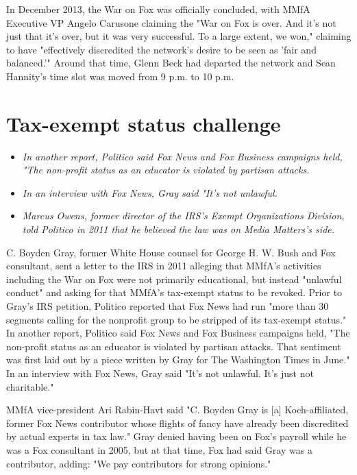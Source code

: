 In December 2013, the War on Fox was officially concluded, with MMfA
Executive VP Angelo Carusone claiming the "War on Fox is over. And it's
not just that it's over, but it was very successful. To a large extent,
we won," claiming to have "effectively discredited the network's desire
to be seen as 'fair and balanced.'" Around that time, Glenn Beck had
departed the network and Sean Hannity's time slot was moved from 9 p.m.
to 10 p.m.

\section{Tax-exempt status challenge}\label{tax-exempt-status-challenge}

\begin{itemize}
\item
  \emph{In another report, Politico said Fox News and Fox Business
  campaigns held, "The non-profit status as an educator is violated by
  partisan attacks.}
\item
  \emph{In an interview with Fox News, Gray said "It's not unlawful.}
\item
  \emph{Marcus Owens, former director of the IRS's Exempt Organizations
  Division, told Politico in 2011 that he believed the law was on Media
  Matters's side.}
\end{itemize}

C. Boyden Gray, former White House counsel for George H. W. Bush and Fox
consultant, sent a letter to the IRS in 2011 alleging that MMfA's
activities including the War on Fox were not primarily educational, but
instead "unlawful conduct" and asking for that MMfA's tax-exempt status
to be revoked. Prior to Gray's IRS petition, Politico reported that Fox
News had run "more than 30 segments calling for the nonprofit group to
be stripped of its tax-exempt status." In another report, Politico said
Fox News and Fox Business campaigns held, "The non-profit status as an
educator is violated by partisan attacks. That sentiment was first laid
out by a piece written by Gray for The Washington Times in June." In an
interview with Fox News, Gray said "It's not unlawful. It's just not
charitable."

MMfA vice-president Ari Rabin-Havt said "C. Boyden Gray is {[}a{]}
Koch-affiliated, former Fox News contributor whose flights of fancy have
already been discredited by actual experts in tax law." Gray denied
having been on Fox's payroll while he was a Fox consultant in 2005, but
at that time, Fox had said Gray was a contributor, adding: "We pay
contributors for strong opinions."

